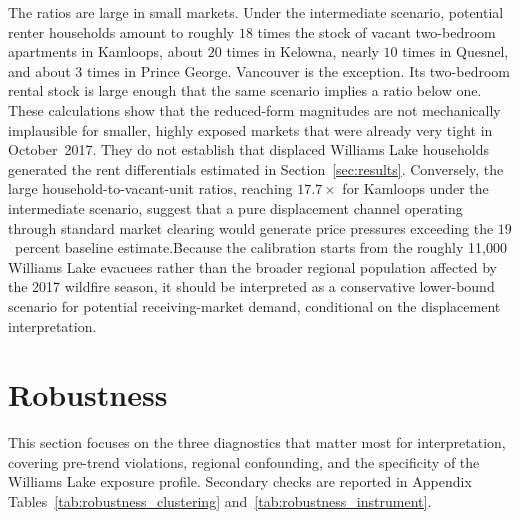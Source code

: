 \documentclass[12pt]{article}
\begin{document}
The ratios are large in small markets. Under the intermediate
scenario, potential renter households amount to roughly $18$ times the stock of
vacant two-bedroom apartments in Kamloops, about $20$ times in Kelowna, nearly
$10$ times in Quesnel, and about $3$ times in Prince George. Vancouver is the exception.
Its two-bedroom rental stock is large enough that the same scenario implies
a ratio below one. These calculations show that the reduced-form magnitudes are
not mechanically implausible for smaller, highly exposed markets that were
already very tight in October~2017. They do not establish that displaced
Williams Lake households generated the rent differentials estimated in
Section~\ref{sec:results}. Conversely, the large household-to-vacant-unit
ratios, reaching $17.7\times$ for Kamloops under the intermediate
scenario, suggest that a pure displacement channel operating through
standard market clearing would generate price pressures exceeding the
$19$~percent baseline estimate.Because the calibration starts from the roughly 11,000 Williams Lake evacuees
rather than the broader regional population affected by the 2017 wildfire season,
it should be interpreted as a conservative lower-bound scenario for potential
receiving-market demand, conditional on the displacement interpretation.

\section{Robustness}
\label{sec:robustness}

This section focuses on the three diagnostics that matter most for
interpretation, covering pre-trend violations, regional confounding, and
the specificity of the Williams Lake exposure profile. Secondary checks are reported in Appendix Tables~\ref{tab:robustness_clustering} and~\ref{tab:robustness_instrument}.

\end{document}
